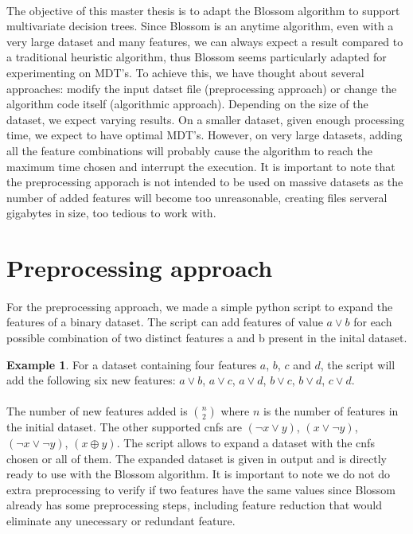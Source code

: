 \documentclass[12pt]{report}
\theoremstyle{definition}
\newtheorem*{example}{Example}
\theoremstyle{definition}
\begin{document}
\paragraph{} The objective of this master thesis is to adapt the Blossom algorithm to support multivariate
decision trees. Since Blossom is an anytime algorithm, even with a very large dataset and many features,
we can always expect a result compared to a traditional heuristic algorithm, thus Blossom seems particularly
adapted for experimenting on MDT's. To achieve this, we have thought about several approaches: modify the
input datset file (preprocessing approach) or change the algorithm code itself (algorithmic approach).
Depending on the size of the dataset, we expect varying results. On a smaller dataset, given enough
processing time, we expect to have optimal MDT's. However, on very large datasets, adding all the feature
combinations will probably cause the algorithm to reach the maximum time chosen and interrupt the execution.
It is important to note that the preprocessing apporach is not intended to be used on massive datasets as
the number of added features will become too unreasonable, creating files serveral gigabytes in size,
too tedious to work with. 

\section{Preprocessing approach}
\paragraph{} For the preprocessing approach, we made a simple python script to expand the features of a binary
dataset. The script can add features of value $a \lor b$ for each possible combination of two distinct
features a and b present in the inital dataset.\\

\begin{example}
    For a dataset containing four features $a$, $b$, $c$ and $d$, the script will add the following six new
    features: $a \lor b$, $a \lor c$, $a \lor d$, $b \lor c$, $b \lor d$, $c \lor d$.
\end{example}

\paragraph{} The number of new features added is $n \choose 2$ where $n$ is the number of features in
the initial dataset. The other supported cnfs are $(\neg x \lor y)$, $(x \lor \neg y)$, $(\neg x \lor \neg y)$, 
$(x \oplus y)$. The script allows to expand a dataset with the cnfs chosen or all of them. The expanded
dataset is given in output and is directly ready to use with the Blossom algorithm. It is important to note
we do not do extra preprocessing to verify if two features have the same values since Blossom already has
some preprocessing steps, including feature reduction that would eliminate any unecessary or redundant feature.
\end{document}
